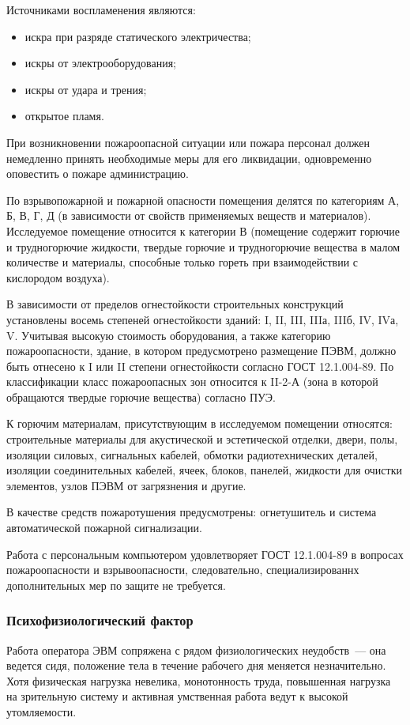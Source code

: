 Источниками воспламенения являются:
\begin{itemize}
  \item искра при разряде статического электричества;
  \item искры от электрооборудования;
  \item искры от удара и трения;
  \item открытое пламя.
\end{itemize}

При возникновении пожароопасной ситуации или пожара персонал должен немедленно принять необходимые меры для его ликвидации, одновременно оповестить о пожаре администрацию.

По взрывопожарной и пожарной опасности помещения делятся по категориям А, Б, В, Г, Д (в зависимости от свойств применяемых веществ и материалов). Исследуемое  помещение относится к категории В (помещение содержит горючие и трудногорючие жидкости, твердые горючие и трудногорючие вещества в малом количестве и материалы, способные только гореть при взаимодействии с кислородом воздуха).

В зависимости от пределов огнестойкости строительных конструкций установлены восемь степеней огнестойкости зданий: I, II, III, IIIа, IIIб, IV, IVа, V. Учитывая высокую стоимость оборудования, а также категорию пожароопасности, здание, в котором предусмотрено размещение ПЭВМ, должно быть отнесено к I или II степени огнестойкости согласно ГОСТ 12.1.004-89. По классификации класс пожароопасных зон относится к II-2-А (зона в которой обращаются твердые горючие вещества) согласно ПУЭ.

К горючим материалам, присутствующим в исследуемом помещении относятся: строительные материалы для акустической и эстетической отделки, двери, полы, изоляции силовых, сигнальных кабелей, обмотки радиотехнических деталей, изоляции соединительных кабелей, ячеек, блоков, панелей, жидкости для очистки элементов, узлов ПЭВМ от загрязнения и другие.

В качестве средств пожаротушения предусмотрены: огнетушитель и система автоматической пожарной сигнализации.

Работа с персональным компьютером удовлетворяет ГОСТ 12.1.004-89 в вопросах пожароопасности и взрывоопасности, следовательно, специализированнх дополнительных мер по защите не требуется.

\subsubsection{Психофизиологический фактор}
Работа оператора ЭВМ сопряжена с рядом физиологических неудобств~--- она ведется сидя, положение тела в течение рабочего дня меняется незначительно.
Хотя физическая нагрузка невелика, монотонность труда, повышенная нагрузка на зрительную систему и активная умственная работа ведут к высокой утомляемости.

